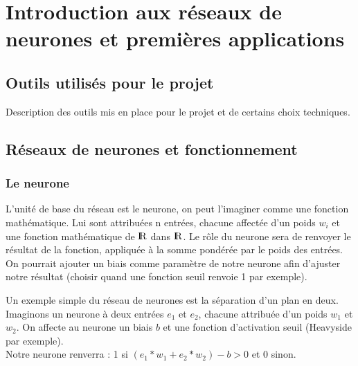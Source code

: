 


\chapter{Introduction aux réseaux de neurones et premières applications}

\section{Outils utilisés pour le projet}

Description des outils mis en place pour le projet et de certains choix techniques.

\section{Réseaux de neurones et fonctionnement}

\subsection{Le neurone} %
\label{sub:le_neurone}
L’unité de base du réseau est le neurone, on peut l’imaginer comme une fonction mathématique. Lui sont attribuées n entrées, chacune affectée d’un poids $w_i$ et une fonction mathématique de $\textrm{I\kern-0.21emR}$ dans $\textrm{I\kern-0.21emR}$. Le rôle du neurone sera de renvoyer le résultat de la fonction, appliquée à la somme pondérée par le poids des entrées. On pourrait ajouter un biais comme paramètre de notre neurone afin d’ajuster notre résultat (choisir quand une fonction seuil renvoie 1 par exemple).

Un exemple simple du réseau de neurones est la séparation d’un plan en deux.\\
Imaginons un neurone à deux entrées $e_1$ et $e_2$, chacune attribuée d’un poids $w_1$ et $w_2$. On affecte au neurone un biais $b$ et une fonction d’activation seuil (Heavyside par exemple).\\
Notre neurone renverra : 1 si $(e_1*w_1+e_2*w_2) - b >0$ et 0 sinon.


